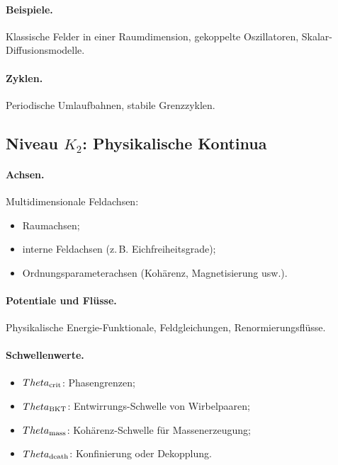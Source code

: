 \paragraph{Beispiele.}
Klassische Felder in einer Raumdimension, gekoppelte Oszillatoren,
Skalar-Diffusionsmodelle.

\paragraph{Zyklen.}
Periodische Umlaufbahnen, stabile Grenzzyklen.

\subsection{Niveau \texorpdfstring{\texorpdfstring{$K_2$}{K\_2}}{K2}: Physikalische Kontinua}

\paragraph{Achsen.}
Multidimensionale Feldachsen:
\begin{itemize}
    \item Raumachsen;
    \item interne Feldachsen (z.\,B. Eichfreiheitsgrade);
    \item Ordnungsparameterachsen (Kohärenz, Magnetisierung usw.).
\end{itemize}

\paragraph{Potentiale und Flüsse.}
Physikalische Energie-Funktionale, Feldgleichungen, Renormierungsflüsse.

\paragraph{Schwellenwerte.}
\begin{itemize}
    \item \(\Theta_{\rm crit}\): Phasengrenzen;
    \item \(\Theta_{\rm BKT}\): Entwirrungs-Schwelle von Wirbelpaaren;
    \item \(\Theta_{\rm mass}\): Kohärenz-Schwelle für Massenerzeugung;
    \item \(\Theta_{\rm death}\): Konfinierung oder Dekopplung.
\end{itemize}

